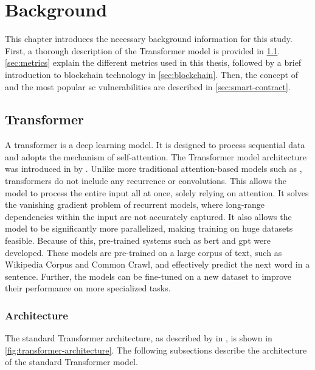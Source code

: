 \chapter{Background}
\label{chap:background}
This chapter introduces the necessary background information for this study. First, a thorough description of the Transformer model is provided in \cref{sec:transformer}. \cref{sec:metrics} explain the different metrics used in this thesis, followed by a brief introduction to blockchain technology in \cref{sec:blockchain}. Then, the concept of  and the most popular \acrshort{sc} vulnerabilities are described in \cref{sec:smart-contract}.

\section{Transformer}
\label{sec:transformer}
A transformer is a deep learning model. It is designed to process sequential data and adopts the mechanism of self-attention. The Transformer model architecture was introduced in \citeyear{vaswani2017attention} by \textcite{vaswani2017attention}. Unlike more traditional attention-based models such as , transformers do not include any recurrence or convolutions. This allows the model to process the entire input all at once, solely relying on attention. It solves the vanishing gradient problem of recurrent models, where long-range dependencies within the input are not accurately captured. It also allows the model to be significantly more parallelized, making training on huge datasets feasible. Because of this, pre-trained systems such as \acrfull{bert} \cite{devlin2018bert} and \acrshort{gpt} \cite{radford2018improving} were developed. These models are pre-trained on a large corpus of text, such as Wikipedia Corpus and Common Crawl, and effectively predict the next word in a sentence. Further, the models can be fine-tuned on a new dataset to improve their performance on more specialized tasks.

\subsection{Architecture}
\label{sec:transformer-architecture}
The standard Transformer architecture, as described by \textcite{vaswani2017attention} in \citeyear{vaswani2017attention}, is shown in \cref{fig:transformer-architecture}. The following subsections describe the architecture of the standard Transformer model.

